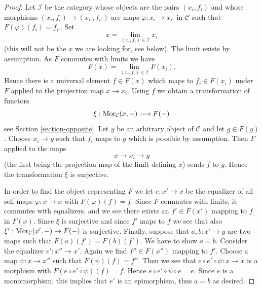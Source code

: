 \begin{proof}
Let $\mathcal{I}$ be the category whose objects are the pairs $(x_i, f_i)$
and whose morphisms $(x_i, f_i) \to (x_{i'}, f_{i'})$ are maps
$\varphi : x_i \to x_{i'}$ in $\mathcal{C}$
such that $F(\varphi)(f_i) = f_{i'}$. Set
$$
x = \lim_{(x_i, f_i) \in \mathcal{I}} x_i
$$
(this will not be the $x$ we are looking for, see below).
The limit exists by assumption. As $F$ commutes with limits
we have
$$
F(x) = \lim_{(x_i, f_i) \in \mathcal{I}} F(x_i).
$$
Hence there is a universal element $f \in F(x)$ which maps to $f_i \in F(x_i)$
under $F$ applied to the projection map $x \to x_i$.
Using $f$ we obtain a transformation of functors
$$
\xi : \mathop{\mathrm{Mor}}\nolimits_\mathcal{C}(x, - ) \longrightarrow F(-)
$$
see Section \ref{section-opposite}. Let $y$ be an arbitrary object of
$\mathcal{C}$ and let $g \in F(y)$. Choose $x_i \to y$ such that $f_i$
maps to $g$ which is possible by assumption. Then $F$ applied to the maps
$$
x \longrightarrow x_i \longrightarrow y
$$
(the first being the projection map of the limit defining $x$)
sends $f$ to $g$. Hence the transformation $\xi$ is surjective.

\medskip\noindent
In order to find the object representing $F$ we let $e : x' \to x$ be the
equalizer of all self maps $\varphi : x \to x$ with $F(\varphi)(f) = f$.
Since $F$ commutes with limits, it commutes with equalizers, and
we see there exists an $f' \in F(x')$ mapping to $f$ in $F(x)$.
Since $\xi$ is surjective and since $f'$ maps to $f$ we see that
also $\xi' : \mathop{\mathrm{Mor}}\nolimits_\mathcal{C}(x', -) \to F(-)$ is surjective.
Finally, suppose that $a, b : x' \to y$ are two maps such that
$F(a)(f') = F(b)(f')$. We have to show $a = b$. Consider the equalizer
$e' : x'' \to x'$. Again we find $f'' \in F(x'')$ mapping to $f'$.
Choose a map $\psi : x \to x''$ such that $F(\psi)(f) = f''$.
Then we see that $e \circ e' \circ \psi : x \to x$ is a morphism
with $F(e \circ e' \circ \psi)(f) = f$. Hence
$e \circ e' \circ \psi \circ e = e$. Since $e$ is a monomorphism,
this implies that $e'$ is an epimorphism, thus $a = b$ as desired.
\end{proof}

